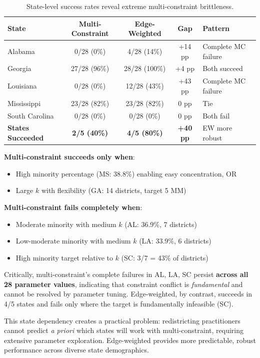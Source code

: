\begin{table}[t]
\centering
\caption{State-level success rates reveal extreme multi-constraint brittleness.}
\label{tab:state-dependency}
\begin{tabular}{lcccl}
\toprule
\textbf{State} & \textbf{Multi-Constraint} & \textbf{Edge-Weighted} & \textbf{Gap} & \textbf{Pattern} \\
\midrule
Alabama & 0/28 (0\%) & 4/28 (14\%) & +14 pp & Complete MC failure \\
Georgia & 27/28 (96\%) & 28/28 (100\%) & +4 pp & Both succeed \\
Louisiana & 0/28 (0\%) & 12/28 (43\%) & +43 pp & Complete MC failure \\
Mississippi & 23/28 (82\%) & 23/28 (82\%) & 0 pp & Tie \\
South Carolina & 0/28 (0\%) & 0/28 (0\%) & 0 pp & Both fail \\
\midrule
\textbf{States Succeeded} & \textbf{2/5 (40\%)} & \textbf{4/5 (80\%)} & \textbf{+40 pp} & EW more robust \\
\bottomrule
\end{tabular}
\end{table}

\textbf{Multi-constraint succeeds only when}:
\begin{itemize}
    \item High minority percentage (MS: 38.8\%) enabling easy concentration, OR
    \item Large $k$ with flexibility (GA: 14 districts, target 5 MM)
\end{itemize}

\textbf{Multi-constraint fails completely when}:
\begin{itemize}
    \item Moderate minority with medium $k$ (AL: 36.9\%, 7 districts)
    \item Low-moderate minority with medium $k$ (LA: 33.9\%, 6 districts)
    \item High minority target relative to $k$ (SC: 3/7 = 43\% of districts)
\end{itemize}

Critically, multi-constraint's complete failures in AL, LA, SC persist \textbf{across all 28 parameter values}, indicating that constraint conflict is \textit{fundamental} and cannot be resolved by parameter tuning. Edge-weighted, by contrast, succeeds in 4/5 states and fails only where the target is fundamentally infeasible (SC).

This state dependency creates a practical problem: redistricting practitioners cannot predict \textit{a priori} which states will work with multi-constraint, requiring extensive parameter exploration. Edge-weighted provides more predictable, robust performance across diverse state demographics.

